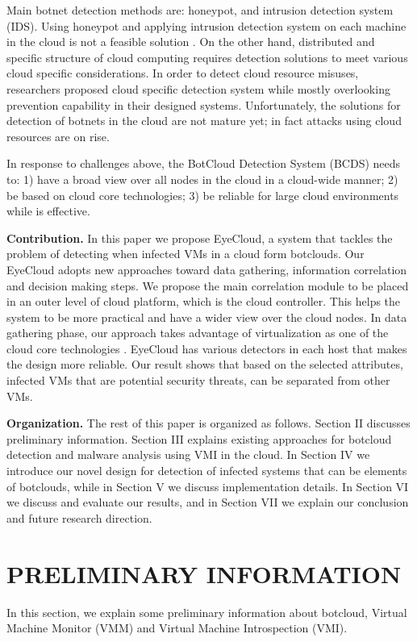 \documentclass[conference]{IEEEtran}
\begin{document}
Main botnet detection methods are: honeypot, and intrusion detection system (IDS). Using honeypot and applying intrusion detection system on each machine in the cloud is not a feasible solution \cite{ref42} \cite{ref38} \cite{ref40}. On the other hand, distributed and specific structure of cloud computing requires detection solutions to meet various cloud specific considerations. In order to detect cloud resource misuses, researchers proposed cloud specific detection system while mostly overlooking prevention capability in their designed systems. Unfortunately, the solutions for detection of botnets in the cloud are not mature yet; in fact attacks using cloud resources are on rise.

In response to challenges above, the BotCloud Detection System (BCDS) needs to: 1) have a broad view over all nodes in the cloud in a cloud-wide manner; 2) be based on cloud core technologies; 3) be reliable for large cloud environments while is effective. 

\textbf{Contribution.}
In this paper we propose EyeCloud, a system that tackles the problem of detecting when infected VMs in a cloud form botclouds. Our EyeCloud adopts new approaches toward data gathering, information correlation and decision making steps. We propose the main correlation module to be placed in an outer level of cloud platform, which is the cloud controller. This helps the system to be more practical and have a wider view over the cloud nodes. In data gathering phase, our approach takes advantage of virtualization as one of the cloud core technologies \cite{ref9}. EyeCloud has various detectors in each host that makes the design more reliable. Our result shows that based on the selected attributes, infected VMs that are potential security threats, can be separated from other VMs. 

\textbf{Organization.}
The rest of this paper is organized as follows. Section II discusses preliminary information. Section III explains existing approaches for botcloud detection and malware analysis using VMI in the cloud. In Section IV we introduce our novel design for detection of infected systems that can be elements of botclouds, while in Section V we discuss implementation details. In Section VI we discuss and evaluate our results, and in Section VII we explain our conclusion and future research direction.
\section{PRELIMINARY INFORMATION }
In this section, we explain some preliminary information about botcloud, Virtual Machine Monitor (VMM) and Virtual Machine Introspection (VMI).
 
\end{document}
